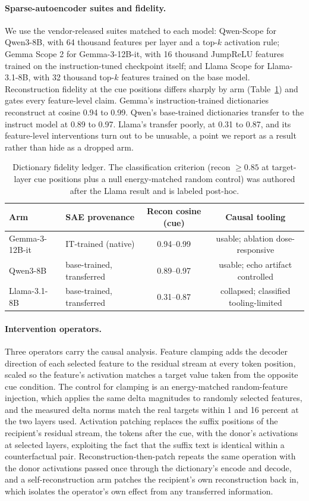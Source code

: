 \documentclass[11pt]{article}
\begin{document}
\paragraph{Sparse-autoencoder suites and fidelity.} We use the vendor-released suites matched to each model: Qwen-Scope for Qwen3-8B, with 64 thousand features per layer and a top-$k$ activation rule; Gemma Scope 2 for Gemma-3-12B-it, with 16 thousand JumpReLU features trained on the instruction-tuned checkpoint itself; and Llama Scope for Llama-3.1-8B, with 32 thousand top-$k$ features trained on the base model. Reconstruction fidelity at the cue positions differs sharply by arm (Table~\ref{tab:fidelity}) and gates every feature-level claim. Gemma's instruction-trained dictionaries reconstruct at cosine 0.94 to 0.99. Qwen's base-trained dictionaries transfer to the instruct model at 0.89 to 0.97. Llama's transfer poorly, at 0.31 to 0.87, and its feature-level interventions turn out to be unusable, a point we report as a result rather than hide as a dropped arm.

\begin{table}[t]
\centering
\begin{tabular}{llcc}
\toprule
Arm & SAE provenance & Recon cosine (cue) & Causal tooling \\
\midrule
Gemma-3-12B-it & IT-trained (native) & 0.94--0.99 & usable; ablation dose-responsive \\
Qwen3-8B & base-trained, transferred & 0.89--0.97 & usable; echo artifact controlled \\
Llama-3.1-8B & base-trained, transferred & 0.31--0.87 & collapsed; classified tooling-limited \\
\bottomrule
\end{tabular}
\caption{Dictionary fidelity ledger. The classification criterion (recon $\ge 0.85$ at target-layer cue positions plus a null energy-matched random control) was authored after the Llama result and is labeled post-hoc.}
\label{tab:fidelity}
\end{table}

\paragraph{Intervention operators.} Three operators carry the causal analysis. Feature clamping adds the decoder direction of each selected feature to the residual stream at every token position, scaled so the feature's activation matches a target value taken from the opposite cue condition. The control for clamping is an energy-matched random-feature injection, which applies the same delta magnitudes to randomly selected features, and the measured delta norms match the real targets within 1 and 16 percent at the two layers used. Activation patching replaces the suffix positions of the recipient's residual stream, the tokens after the cue, with the donor's activations at selected layers, exploiting the fact that the suffix text is identical within a counterfactual pair. Reconstruction-then-patch repeats the same operation with the donor activations passed once through the dictionary's encode and decode, and a self-reconstruction arm patches the recipient's own reconstruction back in, which isolates the operator's own effect from any transferred information.
\end{document}

